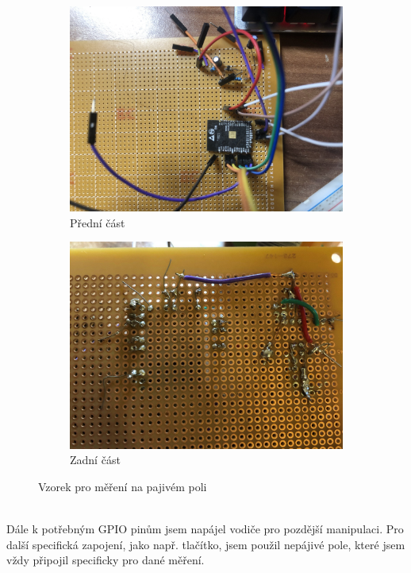 \documentclass[a4paper, 12pt]{report}
\begin{document}
    \begin{figure}[h!]
        \centering
        \begin{subfigure}[b]{0.4\linewidth}
            \includegraphics[width=\linewidth]{images/zapojeni_esp32_vzorek}
            \caption{Přední část}
        \end{subfigure}
        \begin{subfigure}[b]{0.4\linewidth}
            \includegraphics[width=\linewidth]{images/zapojeni_esp32_vzorek_zadek}
            \caption{Zadní část}
        \end{subfigure}
        \caption{Vzorek pro měření na pajivém poli}
        \label{fig:zapojeni_esp32_vzorek}
    \end{figure}\\
    Dále k potřebným GPIO pinům jsem napájel vodiče pro pozdější manipulaci.
    Pro další specifická zapojení, jako např. tlačítko, jsem použil nepájivé pole, které jsem vždy připojil specificky pro dané měření.\\
\end{document}
